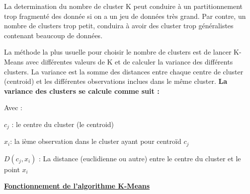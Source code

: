\documentclass[12pt, openany]{report}
\begin{document}
La determination du nombre de cluster K peut conduire à un partitionnement trop fragmenté des donnée si on a un jeu de données très grand. Par contre, un nombre de clusters trop petit, conduira à avoir des cluster trop généralistes contenant beaucoup de données.

La méthode la plus usuelle pour choisir le nombre de clusters est de lancer K-Means avec différentes valeurs de K et de calculer la variance des différents clusters.  La variance est la somme des distances entre chaque centre de cluster (centroid) et les différentes observations inclues dans le même cluster. 
\newline
\textbf{ La variance des clusters se calcule comme suit :\\}
    
Avec :
\begin{mylist}


\item $c_j$ : le centre du cluster (le centroid)
\item $x_i$: la ième observation dans le cluster ayant pour centroïd $c_j$
\item $D(c_j,x_i)$ : La distance (euclidienne ou autre) entre le centre du cluster et le point $x_i$
\end{mylist}


\textbf{\underline{Fonctionnement de l’algorithme K-Means}}\cite{k-means}
\end{document}
